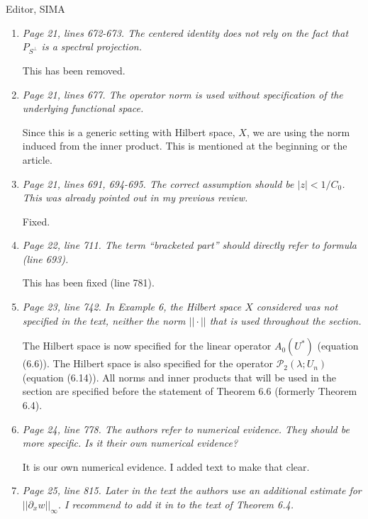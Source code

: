 \documentclass[11pt]{letter}
\begin{document}
\begin{letter}{Editor, SIMA}
\begin{enumerate}
\item \emph{Page 21, lines 672-673. The centered identity does not rely on the fact that $P_{S^\perp}$ is a spectral projection.}

This has been removed.

\item \emph{Page 21, lines 677. The operator norm is used without specification of the underlying functional space.}
\vspace{4mm}

Since this is a generic setting with Hilbert space, $X$, we are using the norm induced from the inner product.  This is mentioned at the beginning or the article.

\item \emph{Page 21, lines 691, 694-695. The correct assumption should be $|z| < 1/C_0$. This was already pointed out in my previous review.}
\vspace{4mm}

Fixed.

\item \emph{Page 22, line 711. The term ``bracketed part'' should directly refer to formula (line 693).}
\vspace{4mm}

This has been fixed (line 781).

\item \emph{Page 23, line 742. In Example 6, the Hilbert space $X$ considered was not specified in the text, neither the norm $||\cdot||$ that is used throughout the section.}
\vspace{4mm}

The Hilbert space is now specified for the linear operator $A_0(U^*)$ (equation (6.6)). The Hilbert space is also specified for the operator $\mathcal{P}_2(\lambda; U_n)$ (equation (6.14)). All norms and inner products that will be used in the section are specified before the statement of Theorem 6.6 (formerly Theorem 6.4).

\item \emph{Page 24, line 778. The authors refer to numerical evidence. They should be more specific. Is it their own numerical evidence?}
\vspace{4mm}

It is our own numerical evidence. I added text to make that clear.

\item \emph{Page 25, line 815. Later in the text the authors use an additional estimate for $||\partial_x w||_\infty$. I recommend to add it in to the text of Theorem 6.4.}
\vspace{4mm}


\end{enumerate}
\end{letter}
\end{document}
